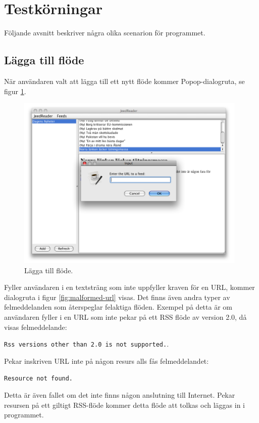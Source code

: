 \documentclass[titlepage, twoside, a4paper, 12pt]{article}
\begin{document}
\section{Testkörningar}\label{Testkorningar}

Följande avsnitt beskriver några olika scenarion för programmet.

\subsection{Lägga till flöde}
När användaren valt att lägga till ett nytt flöde kommer
Popop-dialogruta, se figur \ref{fig:add-feed}.

\begin{figure}[!hbp]
  \begin{center}
    \includegraphics[width=110mm]{images/add-feed.png}
    \caption{Lägga till flöde.}
    \label{fig:add-feed}
  \end{center}
\end{figure}

Fyller användaren i en textsträng som inte uppfyller kraven för en
URL, kommer dialogruta i figur \ref{fig:malformed-url} visas. Det
finns även andra typer av felmeddelanden som återspeglar felaktiga
flöden. Exempel på detta är om användaren fyller i en URL som inte
pekar på ett RSS flöde av version 2.0, då visas felmeddelande:

\verb!Rss versions other than 2.0 is not supported.!.

Pekar inskriven URL inte på någon resurs alls fås felmeddelandet:

\verb!Resource not found.!

Detta är även fallet om det inte finns någon anslutning till
Internet. Pekar resursen på ett giltigt RSS-flöde kommer detta flöde
att tolkas och läggas in i programmet.
\end{document}
